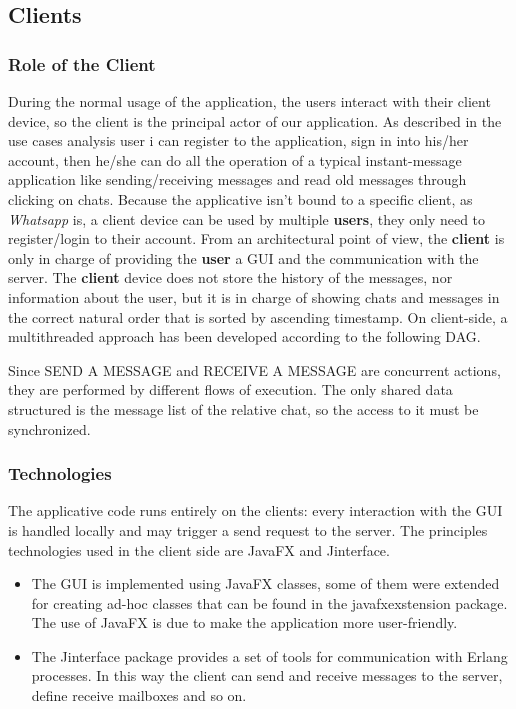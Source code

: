 \subsection{Clients}
\subsubsection{Role of the Client}
During the normal usage of the application, the users interact with their client device, so the client is the principal actor of our application.
As described in the use cases analysis user i can register to the application, sign in into his/her account, then he/she can do all the operation of a typical instant-message application like sending/receiving messages and read old messages through clicking on chats. Because the applicative isn’t bound to a specific client, as \textit{Whatsapp} is, a client device can be used by multiple \textbf{users}, they only need to register/login to their account.
From an architectural point of view, the \textbf{client} is only in charge of providing the \textbf{user} a GUI and the communication with the server. The \textbf{client}  device does not store the history of the messages, nor information about the user, but it is in charge of showing chats and messages in the correct natural order that is sorted by ascending timestamp. On client-side, a multithreaded approach has been developed according to the following DAG.

Since SEND A MESSAGE and RECEIVE A MESSAGE are concurrent actions, they are performed by different flows of execution. The only shared data structured is the message list of the relative chat, so the access to it must be synchronized.

\subsubsection{Technologies}
The applicative code runs entirely on the clients: every interaction with the GUI is handled locally and may trigger a send request to the server. The principles technologies used in the client side are JavaFX and Jinterface.
\begin{itemize}
	\item The GUI is implemented using JavaFX classes, some of them were extended for creating ad-hoc classes that can be found in the javafxexstension package. The use of JavaFX is due to make the application more user-friendly.
	\item The Jinterface package provides a set of tools for communication with Erlang processes. In this way the client can send and receive messages to the server, define receive mailboxes and so on.
\end{itemize}

